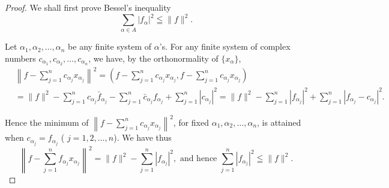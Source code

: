 \begin{proof}
 We shall first prove Bessel's inequality 
\begin{equation}\tag{2'}\label{eq:III.4.2'}
\sum\limits_{\alpha \in A} | f _{\alpha} | ^{2} \leqq \| f \| ^{2}. \end{equation}

Let $\alpha_{1},\alpha_{2},\ldots ,\alpha_{n}$ be any finite system of $\alpha$'s. For any finite system of complex numbers $c_{\alpha_1},c_{\alpha_2},\ldots ,c_{\alpha_n}$, we have, by the orthonormality of $\{x_{\alpha}\}$, 
\begin{equation}\label{eq:III.4.3}
\begin{aligned}
&\left\| f - \sum\limits_{j=1} ^{n} c _ {\alpha_{j}} x _ {\alpha_{j}} \right\| ^{2}  = \left(f - \sum\limits_{j=1} ^{n} c _ {\alpha_{j}} x _ {\alpha_{j}}, f - \sum\limits_{j=1} ^{n} c _ {\alpha_{j}} x _ {\alpha_{j}}\right) \\
&= \| f \| ^{2} - \sum\limits_{j=1} ^{n} c _ {\alpha_{j}} \bar {f} _ {\alpha_{j}} - \sum\limits_{j=1} ^{n} \bar {c} _ {\alpha_{j}} f _ {\alpha_{j}} + \sum\limits_{j=1} ^{n} | c _ {\alpha_{j}} | ^{2} = \| f \| ^{2} - \sum\limits_{j=1} ^{n} | f _ {\alpha_{j}} | ^{2} + \sum\limits_{j=1} ^{n} | f _ {\alpha_{j}} - c _ {\alpha_{j}} | ^{2}.
\end{aligned}
\end{equation}

Hence the minimum of $\left\| f - \sum\limits_{j=1}^{n} c_{\alpha_j} x_{\alpha_j}\right\|^2$, for fixed $\alpha_1, \alpha_2, \ldots, \alpha_n$, is attained when $c_{\alpha_j} = f_{\alpha_j}$ ( $j = 1, 2, \ldots, n$). We have thus 
\begin{equation}\label{eq:III.4.4}
\left\| f - \sum\limits_{j=1} ^{n} f _ {\alpha_{j}} x _ {\alpha_{j}} \right\| ^{2} = \| f \| ^{2} - \sum\limits_{j=1} ^{n} | f _ {\alpha_{j}} | ^{2}, \text{ and hence } \sum\limits_{j=1} ^{n} | f _ {\alpha_{j}} | ^{2} \leqq \| f \| ^{2}.
\end{equation}


\end{proof}
